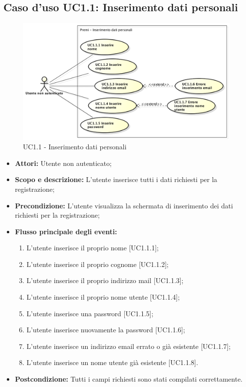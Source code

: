 \subsection{Caso d'uso UC1.1: Inserimento dati personali}
\begin{figure}[h] 
	\centering 
	\includegraphics[scale=0.45] {img/UC1.1.png}
	\caption{UC1.1 - Inserimento dati personali} 
\end{figure}
\begin{itemize}
	\item \textbf{Attori:} Utente non autenticato;
	\item \textbf{Scopo e descrizione:} L'utente inserisce tutti i dati richiesti per la registrazione;
	\item \textbf{Precondizione:} L'utente visualizza la schermata di inserimento dei dati richiesti per la registrazione;
	\item \textbf{Flusso principale degli eventi:}
	\begin{enumerate}
		\item L'utente inserisce il proprio nome [UC1.1.1];
		\item L'utente inserisce il proprio cognome [UC1.1.2];
		\item L'utente inserisce il proprio indirizzo mail [UC1.1.3];
		\item L'utente inserisce il proprio nome utente [UC1.1.4];
		\item L'utente inserisce una password [UC1.1.5];
		\item L'utente inserisce nuovamente la password [UC1.1.6];
		\item L'utente inserisce un indirizzo email errato o già esistente [UC1.1.7];
		\item L'utente inserisce un nome utente già esistente [UC1.1.8].
	\end{enumerate}
	\item \textbf{Postcondizione:} Tutti i campi richiesti sono stati compilati correttamente.
\end{itemize}

